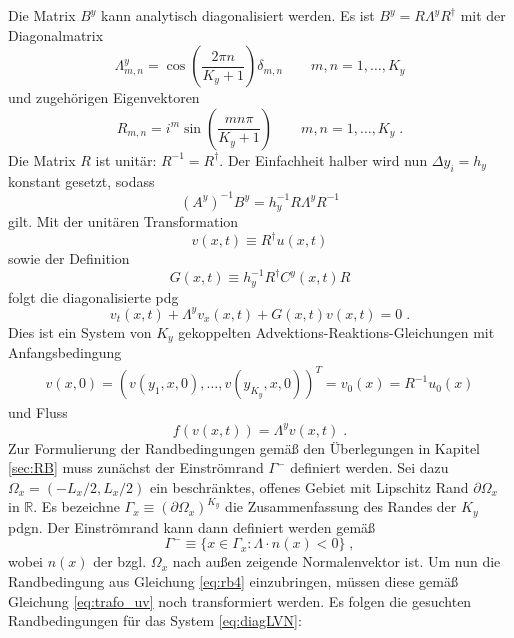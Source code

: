 Die Matrix $B^y$ kann analytisch diagonalisiert werden. Es ist ${B^y = R\Lambda^y R^{\dagger}}$ mit der Diagonalmatrix
\begin{equation}
  \Lambda^y_{m,n} = \cos\left(\frac{2\pi n}{K_y+1}\right)\delta_{m,n}   \qquad m,n = 1,\dots,K_y
  \label{eq:Lambda}
\end{equation}
und zugehörigen Eigenvektoren
\begin{equation}
  R_{m,n} = i^m \sin\left(\frac{mn\pi}{K_y +1} \right)   \qquad m,n = 1,\dots,K_y \; .
  \label{eq:R}
\end{equation}
Die Matrix $R$ ist unitär: $R^{-1} = R^{\dagger}$. Der Einfachheit halber wird nun $\Delta y_i = h_y$ konstant gesetzt, sodass
\begin{equation*}
  (A^y)^{-1}B^y = h_y^{-1}R\Lambda^y R^{-1}
\end{equation*}
gilt. Mit der unitären Transformation
\begin{equation}
  v(x,t) \equiv R^{\dagger}u(x,t) \label{eq:trafo_uv}
\end{equation}
sowie der Definition
\begin{equation}
  G(x,t) \equiv h_y^{-1} R^{\dagger}C^y(x,t)R
  \label{eq:G}
\end{equation}
folgt die diagonalisierte \ac{pdg}
\begin{equation}
  v_t(x,t) + \Lambda^y v_x(x,t) + G(x,t)v(x,t) = 0 \; .
  \label{eq:diagLVN}
\end{equation}
Dies ist ein System von $K_y$ gekoppelten Advektions-Reaktions-Gleichungen mit Anfangsbedingung
\begin{align*}
  v(x,0) = (v(y_1,x,0),\dots,v(y_{K_y},x,0))^T = {v}_0(x) = R^{-1}u_0(x)
\end{align*}
und Fluss
\begin{equation}
  {{f}({v}(x,t))=\Lambda^y {v}(x,t)} \; .
  \label{eq:fluss}
\end{equation}
Zur Formulierung der Randbedingungen gemäß den Überlegungen in Kapitel \ref{sec:RB} muss zunächst der Einströmrand $\Gamma^-$ definiert werden.
Sei dazu ${\Omega_x = (-L_x/2,L_x/2)}$ ein beschränktes, offenes Gebiet mit Lipschitz Rand $\partial\Omega_x$ in  $\mathbb{R}$. Es bezeichne $\Gamma_x\equiv (\partial\Omega_x)^{K_y}$ die Zusammenfassung des Randes der $K_y$ \ac{pdg}n. Der Einströmrand kann dann definiert werden gemäß
\begin{equation*}
  \Gamma^- \equiv \{x\in\Gamma_x : \Lambda \cdot n(x) < 0\} \; ,
\end{equation*}
wobei $n(x)$ der bzgl. $\Omega_x$ nach außen zeigende Normalenvektor ist. Um nun die Randbedingung aus Gleichung \eqref{eq:rb4} einzubringen, müssen diese gemäß Gleichung \eqref{eq:trafo_uv} noch transformiert werden. Es folgen die gesuchten Randbedingungen für das System \eqref{eq:diagLVN}:
